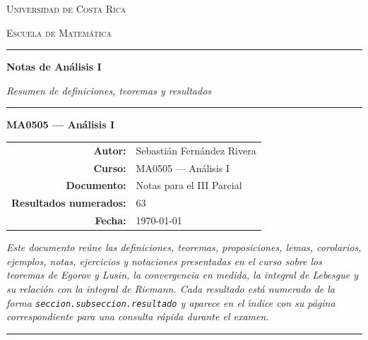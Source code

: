 \documentclass[11pt,twoside]{article}
\newcounter{result}[subsection]
\begin{document}
\begin{titlepage}
\thispagestyle{empty}
\centering

\vspace*{1.5cm}

{\scshape\Large Universidad de Costa Rica\par}
\vspace{0.3cm}
{\scshape\large Escuela de Matem\'atica\par}

\vspace{1.2cm}

{\color{blue!50!black}\rule{\textwidth}{1.2pt}}
\vspace{0.6cm}

{\Huge\bfseries Notas de An\'alisis I\par}

\vspace{0.5cm}

{\Large\itshape Resumen de definiciones, teoremas y resultados\par}

\vspace{0.4cm}
{\color{blue!50!black}\rule{\textwidth}{1.2pt}}

\vspace{1.4cm}

{\Large\bfseries MA0505 --- An\'alisis I\par}

\vspace{2.2cm}

\begin{tabular}{rl}
\textbf{Autor:}              & Sebasti\'{a}n Fern\'{a}ndez Rivera \\[4pt]
\textbf{Curso:}              & MA0505 --- An\'alisis I \\[4pt]
\textbf{Documento:}          & Notas para el III Parcial \\[4pt]
\textbf{Resultados numerados:} & 63 \\[4pt]
\textbf{Fecha:}              & \today
\end{tabular}

\vfill

\begin{minipage}{0.85\textwidth}
\centering
\itshape
Este documento re\'{u}ne las definiciones, teoremas, proposiciones, lemas, corolarios, ejemplos, notas, ejercicios y notaciones presentadas en el curso sobre los teoremas de Egorov y Lusin, la convergencia en medida, la integral de Lebesgue y su relaci\'{o}n con la integral de Riemann. Cada resultado est\'{a} numerado de la forma \texttt{seccion.subseccion.resultado} y aparece en el \'{\i}ndice con su p\'{a}gina correspondiente para una consulta r\'{a}pida durante el examen.
\end{minipage}

\vspace{1cm}

{\color{blue!50!black}\rule{0.5\textwidth}{0.6pt}}

\end{titlepage}
\end{document}
